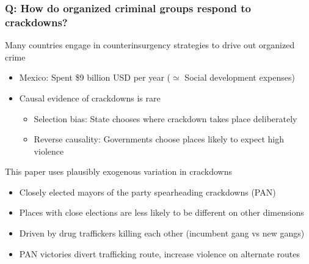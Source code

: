 \documentclass[aspectratio=169]{beamer}
\begin{document}
\begin{frame}
\frametitle{Q: How do organized criminal groups respond to crackdowns?} 
Many countries engage in counterinsurgency strategies to drive out organized crime
\begin{itemize}\setlength\itemsep{3pt}
\item Mexico: Spent \$9 billion USD per year ($\simeq$ Social development expenses)
\item Causal evidence of crackdowns is rare
\begin{itemize}\setlength\itemsep{3pt}
\item Selection bias: State chooses where crackdown takes place deliberately
\item Reverse causality: Governments choose places likely to expect high violence
\end{itemize}
\end{itemize}\medskip
This paper uses plausibly exogenous variation in crackdowns 
\begin{itemize}\setlength\itemsep{3pt}
  \item Closely elected mayors of the party spearheading crackdowns (PAN)
  \item Places with close elections are less likely to be different on other dimensions
  \item Driven by drug traffickers killing each other (incumbent gang vs new gangs)
  \item PAN victories divert trafficking route, increase violence on alternate routes
\end{itemize}\medskip
\end{frame}
\end{document}
